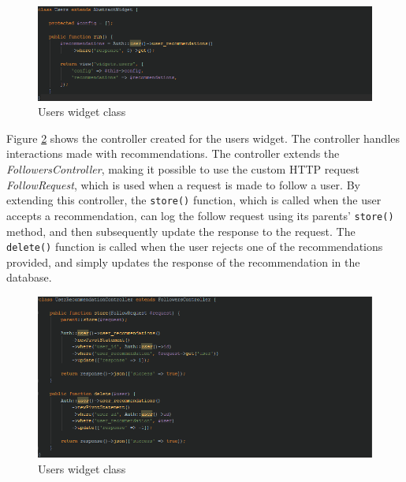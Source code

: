 \begin{figure}[H]
\centering
\includegraphics[width=1\textwidth]{Images/Implementation/UsersWidget}
\caption{Users widget class}
\label{fig:UsersWidget}
\end{figure}

Figure \ref{fig:UserRecommendationsController} shows the controller created for the users widget. The controller handles interactions made with recommendations. The controller extends the \textit{FollowersController}, making it possible to use the custom HTTP request \textit{FollowRequest}, which is used when a request is made to follow a user. By extending this controller, the \texttt{store()} function, which is called when the user accepts a recommendation, can log the follow request using its parents' \texttt{store()} method, and then subsequently update the response to the request. The \texttt{delete()} function is called when the user rejects one of the recommendations provided, and simply updates the response of the recommendation in the database.

\begin{figure}[H]
\centering
\includegraphics[width=1\textwidth]{Images/Implementation/UserRecommendationsController}
\caption{Users widget class}
\label{fig:UserRecommendationsController}
\end{figure}